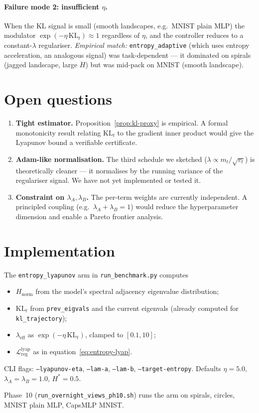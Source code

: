 \documentclass[11pt,a4paper]{article}
\newcommand{\Lreg}{\mathcal{L}_{\text{reg}}}
\begin{document}
\paragraph{Failure mode 2: insufficient $\eta$.}
When the KL signal is small (smooth landscapes, e.g.\ MNIST plain MLP)
the modulator $\exp(-\eta\,\mathrm{KL}_t) \approx 1$ regardless of
$\eta$, and the controller reduces to a constant-$\lambda$
regulariser. \emph{Empirical match:} \texttt{entropy\_adaptive} (which
uses entropy acceleration, an analogous signal) was task-dependent
--- it dominated on spirals (jagged landscape, large
$\ddot{H}$) but was mid-pack on MNIST (smooth landscape).

\section{Open questions}

\begin{enumerate}
  \item \textbf{Tight estimator.} Proposition~\ref{prop:kl-proxy} is
        empirical. A formal monotonicity result relating
        $\mathrm{KL}_t$ to the gradient inner product would give the
        Lyapunov bound a verifiable certificate.
  \item \textbf{Adam-like normalisation.} The third schedule we
        sketched ($\lambda \propto m_t / \sqrt{v_t}$) is theoretically
        cleaner --- it normalises by the running variance of the
        regulariser signal. We have not yet implemented or tested it.
  \item \textbf{Constraint on $\lambda_A, \lambda_B$.} The per-term
        weights are currently independent. A principled coupling
        (e.g.\ $\lambda_A + \lambda_B = 1$) would reduce the
        hyperparameter dimension and enable a Pareto frontier
        analysis.
\end{enumerate}

\section{Implementation}

The \texttt{entropy\_lyapunov} arm in
\texttt{run\_benchmark.py} computes
\begin{itemize}
  \item $H_{\text{norm}}$ from the model's spectral adjacency
        eigenvalue distribution;
  \item $\mathrm{KL}_t$ from \texttt{prev\_eigvals} and the current
        eigenvals (already computed for \texttt{kl\_trajectory});
  \item $\lambda_{\text{eff}}$ as $\exp(-\eta\,\mathrm{KL}_t)$,
        clamped to $[0.1, 10]$;
  \item $\Lreg^{\text{lyap}}$ as in equation~\eqref{eq:entropy-lyap}.
\end{itemize}

CLI flags: \texttt{--lyapunov-eta}, \texttt{--lam-a},
\texttt{--lam-b}, \texttt{--target-entropy}. Defaults
$\eta{=}5.0$, $\lambda_A{=}\lambda_B{=}1.0$, $H^*{=}0.5$.

Phase~10 (\texttt{run\_overnight\_views\_ph10.sh}) runs the arm on
spirals, circles, MNIST plain MLP, CapsMLP MNIST.
\end{document}
